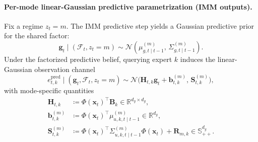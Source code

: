 \paragraph{Per-mode linear-Gaussian predictive parametrization (IMM outputs).}
Fix a regime \(z_t=m\).
The IMM predictive step yields a Gaussian predictive prior for the shared factor:
\begin{equation}
\label{eq:exp_g_prior}
\mathbf{g}_t\mid(\mathcal{F}_t,z_t=m)\sim
\mathcal{N}\!\left(\mu^{(m)}_{g,t\mid t-1},\,\Sigma^{(m)}_{g,t\mid t-1}\right).
\end{equation}
Under the factorized predictive belief, querying expert \(k\) induces the linear-Gaussian observation channel
\begin{equation}
\label{eq:exp_channel}
e_{t,k}^{\mathrm{pred}} \mid (\mathbf{g}_t,\mathcal{F}_t,z_t=m)
\sim
\mathcal{N}\!\big(\mathbf{H}_{t,k}\mathbf{g}_t + \mathbf{b}^{(m)}_{t,k},\, \mathbf{S}^{(m)}_{t,k}\big),
\end{equation}
with mode-specific quantities
\begin{equation}
\label{eq:exp_channel_params}
\begin{aligned}
\mathbf{H}_{t,k} &\coloneqq \Phi(\mathbf{x}_t)^\top \mathbf{B}_k\in\mathbb{R}^{d_y\times d_g},\\
\mathbf{b}^{(m)}_{t,k} &\coloneqq \Phi(\mathbf{x}_t)^\top \mu^{(m)}_{u,k,t\mid t-1}\in\mathbb{R}^{d_y},\\
\mathbf{S}^{(m)}_{t,k} &\coloneqq
\Phi(\mathbf{x}_t)^\top \Sigma^{(m)}_{u,k,t\mid t-1}\Phi(\mathbf{x}_t) + \mathbf{R}_{m,k}\in\mathbb{S}^{d_y}_{++}.
\end{aligned}
\end{equation}

